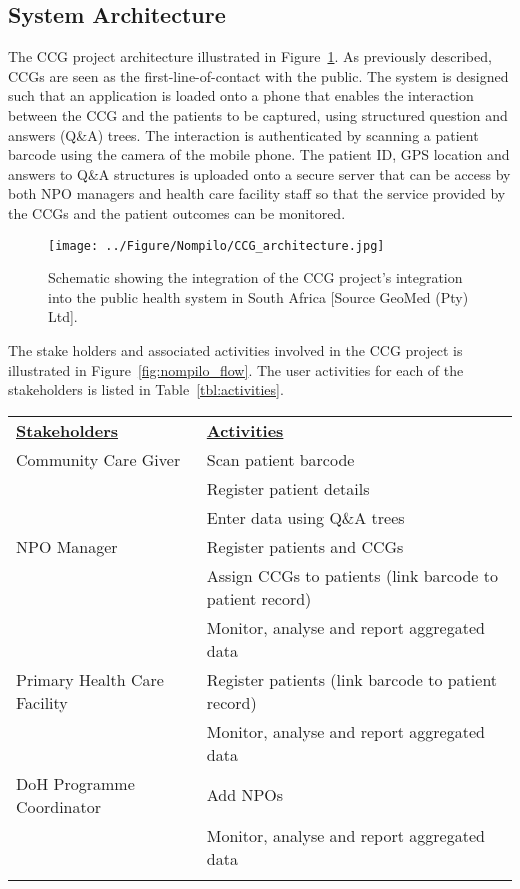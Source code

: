 \subsection*{System Architecture}

The CCG project architecture illustrated in Figure~\ref{fig:cbs_nompilo}. 
As previously described, CCGs are seen as the first-line-of-contact with 
the public. The system is designed such that an application is loaded onto 
a phone that enables the interaction between the CCG and the patients 
to be captured, using structured question and answers (Q\&A) trees. 
The interaction is authenticated by scanning a patient barcode using the 
camera of the mobile phone. The patient ID, GPS location and answers to 
Q\&A structures is uploaded onto a secure server that can be access by both 
NPO managers and health care facility staff so that the service provided 
by the CCGs and the patient outcomes can be monitored.  

\begin{figure} \centering 
\texttt{[image: ../Figure/Nompilo/CCG\_architecture.jpg]}
\caption{Schematic showing the integration of the CCG project's integration 
into the public health system in South Africa [Source GeoMed (Pty) Ltd].}
\label{fig:cbs_nompilo}
\end{figure}

The stake holders and associated activities involved in the CCG project 
is illustrated in Figure~\ref{fig:nompilo_flow}. The user activities for 
each of the stakeholders is listed in Table~\ref{tbl:activities}.

\begin{tabular}{ll}
{\bf \underline{Stakeholders}} & {\bf \underline{Activities}}\\
Community Care Giver & Scan patient barcode\\
~ & Register patient details\\
~ & Enter data using Q\&A trees\\
NPO Manager & Register patients and CCGs\\
~ & Assign CCGs to patients (link barcode to patient record)\\
~ & Monitor, analyse and report aggregated data\\
Primary Health Care Facility & Register patients (link barcode to patient record)\\
~ & Monitor, analyse and report aggregated data\\
DoH Programme Coordinator & Add NPOs\\
~ & Monitor, analyse and report aggregated data\\  
\label{tbl:user_activities}
\end{tabular}

